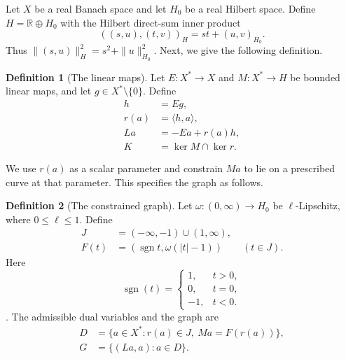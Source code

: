 \documentclass[11pt]{article}
\newcommand{\R}{\mathbb R}
\newcommand{\sgn}{\operatorname{sgn}}
\newcommand{\pair}[2]{\langle #1,#2\rangle}
\theoremstyle{definition}
\newtheorem{definition}{Definition}
\theoremstyle{remark}
\begin{document}




Let $X$ be a real Banach space and let $H_0$ be a real Hilbert space. Define $H=\R\oplus H_0$ with the Hilbert direct-sum inner product
\[
((s,u),(t,v))_H=st+(u,v)_{H_0}.
\]
Thus $\|(s,u)\|_H^2=s^2+\|u\|_{H_0}^2$. Next, we give the following definition. 

\begin{definition}[The linear maps]
\label{def:construction-maps}
Let $E:X^*\to X$ and $M:X^*\to H$ be bounded linear maps, and let $g\in X^*\setminus\{0\}$. Define
\[
\begin{aligned}
h&=Eg,\\
r(a)&=\pair{h}{a},\\
La&=-Ea+r(a)h,\\
K&=\ker M\cap\ker r.
\end{aligned}
\]
\end{definition}

We use $r(a)$ as a scalar parameter and constrain $Ma$ to lie on a prescribed curve at that parameter. This specifies the graph as follows.

\begin{definition}[The constrained graph]
\label{def:construction-graph}
Let $\omega:(0,\infty)\to H_0$ be $\ell$-Lipschitz, where $0\le\ell\le1$. Define
\[
\begin{aligned}
J&=(-\infty,-1)\cup(1,\infty),\\
F(t)&=(\sgn t,\omega(|t|-1))\qquad(t\in J).
\end{aligned}
\]
Here \[
\operatorname{sgn}(t)=
\begin{cases}
1, & t>0,\\
0, & t=0,\\
-1, & t<0.
\end{cases}
\]. 
The admissible dual variables and the graph are
\begin{equation}
\begin{aligned}
D&=\{a\in X^*:r(a)\in J,\ Ma=F(r(a))\},\\
G&=\{(La,a):a\in D\}.
\end{aligned}
\label{eq:abs-full-graph}
\end{equation}
\end{definition}
\end{document}
